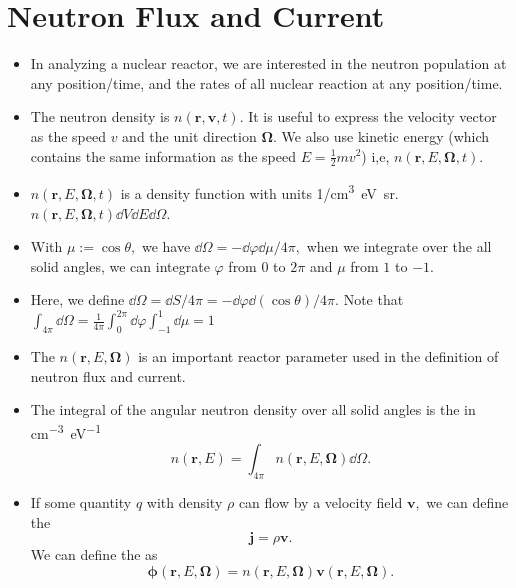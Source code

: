 \documentclass[a4paper]{article}
\begin{document}
\section{Neutron Flux and Current}
\begin{itemize}
    \item In analyzing a nuclear reactor, we are interested in the neutron population at any position/time, and the rates of all nuclear reaction at any position/time.
    \item The neutron density is $n(\mathbf r, \mathbf v, t)$. It is useful to express the velocity vector as the speed $v$ and the unit direction $\mathbf\Omega$. We also use kinetic energy (which contains the same information as the speed $E=\frac{1}{2}mv^2$) i,e, $n(\mathbf r,E,\mathbf\Omega, t)$.
    \item $n(\mathbf r,E,\mathbf\Omega, t)$ is a density function with units \si{1/cm^3\electronvolt\steradian}. $n(\mathbf r,E,\mathbf\Omega, t)\dd V\dd E\dd\Omega$.
    \item With $\mu:=\cos\theta,$ we have $\dd\Omega=-\dd\varphi\dd\mu/4\pi,$ when we integrate over the all solid angles, we can integrate $\varphi$ from $0$ to $2\pi$ and $\mu$ from $1$ to $-1$.
    \item Here, we define $\dd\Omega=\dd S/4\pi=-\dd\varphi\dd(\cos\theta)/4\pi$. Note that $\int_{4\pi}\dd\Omega=\frac{1}{4\pi}\int_0^{2\pi}\dd\varphi\int_{-1}^1\dd\mu=1$
    \item The  $n(\mathbf r, E, \mathbf\Omega)$ is an important reactor parameter used in the definition of neutron flux and current.
    \item The integral of the angular neutron density over all solid angles is the  in \si{cm^{-3}\electronvolt^{-1}}\begin{equation}
        n(\mathbf r, E)=\int_{4\pi}n(\mathbf r, E, \mathbf\Omega)\dd\Omega.
    \end{equation}
    \item If some quantity $q$ with density $\rho$ can flow by a velocity field $\mathbf v,$ we can define the \begin{equation}
        \mathbf j=\rho\mathbf v.
    \end{equation} We can define the  as\begin{equation}
        \mathbf\phi(\mathbf r, E,\mathbf\Omega)=n(\mathbf r, E,\mathbf\Omega)\mathbf v(\mathbf r, E,\mathbf\Omega).
    \end{equation}

\end{itemize}
\end{document}

